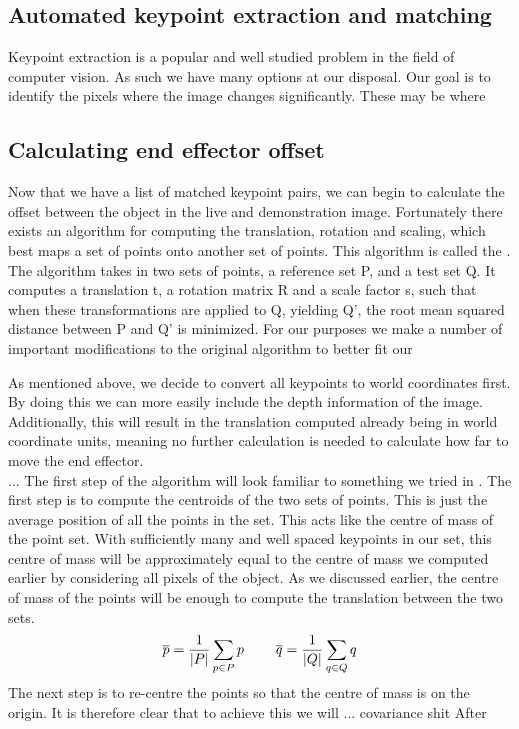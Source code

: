 \subsection{Automated keypoint extraction and matching}
\label{subsec:keypoint-algos}
Keypoint extraction is a popular and well studied problem in the field of computer vision. As such we have many options at our disposal. Our goal is to identify the pixels where the image changes significantly. These may be where 

\subsection{Calculating end effector offset}
\label{subsec:kabsch}
Now that we have a list of matched keypoint pairs, we can begin to calculate the offset between the object in the live and demonstration image. Fortunately there exists an algorithm for computing the translation, rotation and scaling, which best maps a set of points onto another set of points. This algorithm is called the . The algorithm takes in two sets of points, a reference set P, and a test set Q. It computes a translation t, a rotation matrix R and a scale factor s, such that when these transformations are applied to Q, yielding Q', the root mean squared distance between P and Q' is minimized. For our purposes we make a number of important modifications to the original algorithm to better fit our 

As mentioned above, we decide to convert all keypoints to world coordinates first. By doing this we can more easily include the depth information of the image. Additionally, this will result in the translation computed already being in world coordinate units, meaning no further calculation is needed to calculate how far to move the end effector.\\

...
The first step of the algorithm will look familiar to something we tried in . The first step is to compute the centroids of the two sets of points. This is just the average position of all the points in the set. This acts like the centre of mass of the point set. With sufficiently many and well spaced keypoints in our set, this centre of mass will be approximately equal to the centre of mass we computed earlier by considering all pixels of the object. As we discussed earlier, the centre of mass of the points will be enough to compute the translation between the two sets.
$$\overline{p} = \frac{1}{|P|}\sum_{p \in P}p \operatorname{\operatorname{\: \: \: \:} \operatorname{\: \: \: \:}} \overline{q} = \frac{1}{|Q|}\sum_{q \in Q}q$$
The next step is to re-centre the points so that the centre of mass is on the origin. It is therefore clear that to achieve this we will 
... covariance shit
After 

